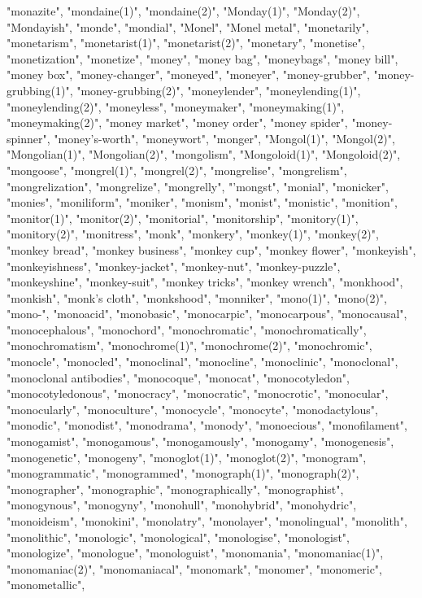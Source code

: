 "monazite",
"mondaine(1)",
"mondaine(2)",
"Monday(1)",
"Monday(2)",
"Mondayish",
"monde",
"mondial",
"Monel",
"Monel metal",
"monetarily",
"monetarism",
"monetarist(1)",
"monetarist(2)",
"monetary",
"monetise",
"monetization",
"monetize",
"money",
"money bag",
"moneybags",
"money bill",
"money box",
"money-changer",
"moneyed",
"moneyer",
"money-grubber",
"money-grubbing(1)",
"money-grubbing(2)",
"moneylender",
"moneylending(1)",
"moneylending(2)",
"moneyless",
"moneymaker",
"moneymaking(1)",
"moneymaking(2)",
"money market",
"money order",
"money spider",
"money-spinner",
"money's-worth",
"moneywort",
"monger",
"Mongol(1)",
"Mongol(2)",
"Mongolian(1)",
"Mongolian(2)",
"mongolism",
"Mongoloid(1)",
"Mongoloid(2)",
"mongoose",
"mongrel(1)",
"mongrel(2)",
"mongrelise",
"mongrelism",
"mongrelization",
"mongrelize",
"mongrelly",
"'mongst",
"monial",
"monicker",
"monies",
"moniliform",
"moniker",
"monism",
"monist",
"monistic",
"monition",
"monitor(1)",
"monitor(2)",
"monitorial",
"monitorship",
"monitory(1)",
"monitory(2)",
"monitress",
"monk",
"monkery",
"monkey(1)",
"monkey(2)",
"monkey bread",
"monkey business",
"monkey cup",
"monkey flower",
"monkeyish",
"monkeyishness",
"monkey-jacket",
"monkey-nut",
"monkey-puzzle",
"monkeyshine",
"monkey-suit",
"monkey tricks",
"monkey wrench",
"monkhood",
"monkish",
"monk's cloth",
"monkshood",
"monniker",
"mono(1)",
"mono(2)",
"mono-",
"monoacid",
"monobasic",
"monocarpic",
"monocarpous",
"monocausal",
"monocephalous",
"monochord",
"monochromatic",
"monochromatically",
"monochromatism",
"monochrome(1)",
"monochrome(2)",
"monochromic",
"monocle",
"monocled",
"monoclinal",
"monocline",
"monoclinic",
"monoclonal",
"monoclonal antibodies",
"monocoque",
"monocat",
"monocotyledon",
"monocotyledonous",
"monocracy",
"monocratic",
"monocrotic",
"monocular",
"monocularly",
"monoculture",
"monocycle",
"monocyte",
"monodactylous",
"monodic",
"monodist",
"monodrama",
"monody",
"monoecious",
"monofilament",
"monogamist",
"monogamous",
"monogamously",
"monogamy",
"monogenesis",
"monogenetic",
"monogeny",
"monoglot(1)",
"monoglot(2)",
"monogram",
"monogrammatic",
"monogrammed",
"monograph(1)",
"monograph(2)",
"monographer",
"monographic",
"monographically",
"monographist",
"monogynous",
"monogyny",
"monohull",
"monohybrid",
"monohydric",
"monoideism",
"monokini",
"monolatry",
"monolayer",
"monolingual",
"monolith",
"monolithic",
"monologic",
"monological",
"monologise",
"monologist",
"monologize",
"monologue",
"monologuist",
"monomania",
"monomaniac(1)",
"monomaniac(2)",
"monomaniacal",
"monomark",
"monomer",
"monomeric",
"monometallic",
